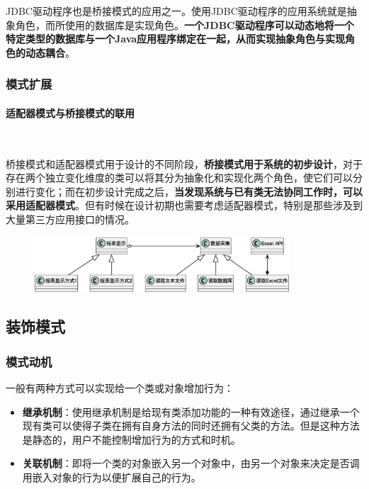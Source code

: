  JDBC驱动程序也是桥接模式的应用之一。使用JDBC驱动程序的应用系统就是抽象角色，而所使用的数据库是实现角色。\textbf{一个JDBC驱动程序可以动态地将一个特定类型的数据库与一个Java应用程序绑定在一起，从而实现抽象角色与实现角色的动态耦合}。

\subsubsection{模式扩展}
\paragraph*{适配器模式与桥接模式的联用}~{} \par
桥接模式和适配器模式用于设计的不同阶段，\textbf{桥接模式用于系统的初步设计}，对于存在两个独立变化维度的类可以将其分为抽象化和实现化两个角色，使它们可以分别进行变化；而在初步设计完成之后，\textbf{当发现系统与已有类无法协同工作时，可以采用适配器模式}。但有时候在设计初期也需要考虑适配器模式，特别是那些涉及到大量第三方应用接口的情况。
\begin{figure}[H]
    \vspace{-0.5em}
	\centering
	\includegraphics[width=0.85\textwidth]{images/桥接模式拓展.eps}
    \vspace{-1em}
\end{figure}

\subsection{装饰模式}

\subsubsection{模式动机}
一般有两种方式可以实现给一个类或对象增加行为：
\begin{itemize}
    \item \textbf{继承机制}：使用继承机制是给现有类添加功能的一种有效途径，通过继承一个现有类可以使得子类在拥有自身方法的同时还拥有父类的方法。但是这种方法是静态的，用户不能控制增加行为的方式和时机。
    \item \textbf{关联机制}：即将一个类的对象嵌入另一个对象中，由另一个对象来决定是否调用嵌入对象的行为以便扩展自己的行为。
\end{itemize}

